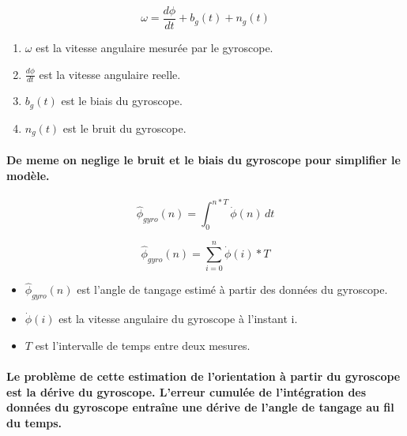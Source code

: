 \begin{equation}
	\omega = \frac{d\phi}{dt} + b_g(t) + n_g(t)
\end{equation}

\begin{enumerate}
	\item $\omega$ est la vitesse angulaire mesurée par le gyroscope.
	\item $\frac{d\phi}{dt}$ est la vitesse angulaire reelle.
	\item $b_g(t)$ est le biais du gyroscope.
	\item $n_g(t)$ est le bruit du gyroscope.
\end{enumerate}

\paragraph{De meme on neglige le bruit et le biais du gyroscope pour simplifier le modèle.}
\begin{equation}
	\hat{\phi}_{gyro}(n) =  \int_{0}^{n*T} \dot{\phi}(n) \,dt
\end{equation}

\begin{equation}
	\hat{\phi}_{gyro}(n) =  \sum_{i=0}^{n} \dot{\phi}(i) * T
\end{equation}

\begin{itemize}
	\item $\hat{\phi}_{gyro}(n)$ est l'angle de tangage estimé à partir des données du gyroscope.
	\item $\dot{\phi}(i)$ est la vitesse angulaire du gyroscope à l'instant i.
	\item $T$ est l'intervalle de temps entre deux mesures.
\end{itemize}

\paragraph{Le problème de cette estimation de l'orientation à partir du gyroscope est la dérive du gyroscope. L'erreur cumulée de l'intégration des données du gyroscope entraîne une dérive de l'angle de tangage au fil du temps.}
